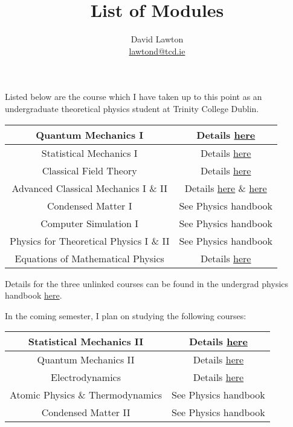 \documentclass{article}
\title{List of Modules}
\author{David Lawton\\ \url{lawtond@tcd.ie}}
\begin{document}
\maketitle
Listed below are the course which I have taken up to this point as an undergraduate theoretical physics student at Trinity College Dublin.

\begin{center}
\begin{tabular}{c|c}
    
    Quantum Mechanics I & Details \href{https://www.maths.tcd.ie/undergraduate/modules/MAU34403.php}{here}\\\hline
    Statistical Mechanics I & Details \href{https://www.maths.tcd.ie/undergraduate/modules/MAU34406.php}{here}\\\hline
    Classical Field Theory & Details \href{https://www.maths.tcd.ie/undergraduate/modules/MAU34401.php}{here}\\\hline
    Advanced Classical Mechanics I \& II & Details \href{https://www.maths.tcd.ie/undergraduate/modules/MAU22401.php}{here} \& \href{https://www.maths.tcd.ie/undergraduate/modules/MAU22402.php}{here}\\\hline
    Condensed Matter I & See Physics handbook\\\hline
    Computer Simulation I & See Physics handbook\\\hline
    Physics for Theoretical Physics I \& II & See Physics handbook\\\hline
    Equations of Mathematical Physics & Details \href{https://www.maths.tcd.ie/undergraduate/modules/MAU23403.php}{here}\\
    
\end{tabular}

\end{center}
Details for the three unlinked courses can be found in the undergrad physics handbook \href{https://www.tcd.ie/media/tcd/physics/pdfs/Physics-UG-Handbook-2024-25-(1).pdf}{here}.

In the coming semester, I plan on studying the following courses:
\begin{center}
    \begin{tabular}{c|c}
        Statistical Mechanics II & Details \href{https://www.maths.tcd.ie/undergraduate/modules/MAU34406.php}{here}\\\hline
        Quantum Mechanics II & Details \href{https://www.maths.tcd.ie/undergraduate/modules/MAU34404.php}{here}\\\hline
        Electrodynamics & Details \href{https://www.maths.tcd.ie/undergraduate/modules/MAU34402.php}{here}\\\hline
        Atomic Physics \& Thermodynamics & See Physics handbook\\\hline
        Condensed Matter II & See Physics handbook \\
    \end{tabular}
\end{center}
\end{document}
